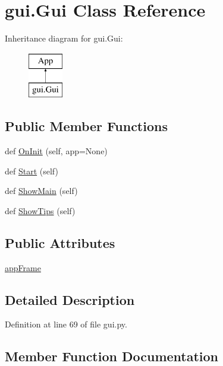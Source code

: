 \hypertarget{classgui_1_1Gui}{}\section{gui.\+Gui Class Reference}
\label{classgui_1_1Gui}
Inheritance diagram for gui.\+Gui\+:\begin{figure}[H]
\begin{center}
\leavevmode
\includegraphics[height=2.000000cm]{classgui_1_1Gui}
\end{center}
\end{figure}
\subsection*{Public Member Functions}
\begin{DoxyCompactItemize}
\item 
def \hyperlink{classgui_1_1Gui_aadde570d41694a77449af20a9c9ecd93}{On\+Init} (self, app=None)
\item 
def \hyperlink{classgui_1_1Gui_acfdb1311df034a58ca8dc817b6002ca2}{Start} (self)
\item 
def \hyperlink{classgui_1_1Gui_a676a880af81990ff051f7f6e4b12e9db}{Show\+Main} (self)
\item 
def \hyperlink{classgui_1_1Gui_ad535e23af581441535c3d9e9e13422c8}{Show\+Tips} (self)
\end{DoxyCompactItemize}
\subsection*{Public Attributes}
\begin{DoxyCompactItemize}
\item 
\hyperlink{classgui_1_1Gui_a8dd3e3c3487fdde75eaa7d9b6b68cfa4}{app\+Frame}
\end{DoxyCompactItemize}


\subsection{Detailed Description}


Definition at line 69 of file gui.\+py.



\subsection{Member Function Documentation}
\mbox{\label{classgui_1_1Gui_aadde570d41694a77449af20a9c9ecd93}} 

